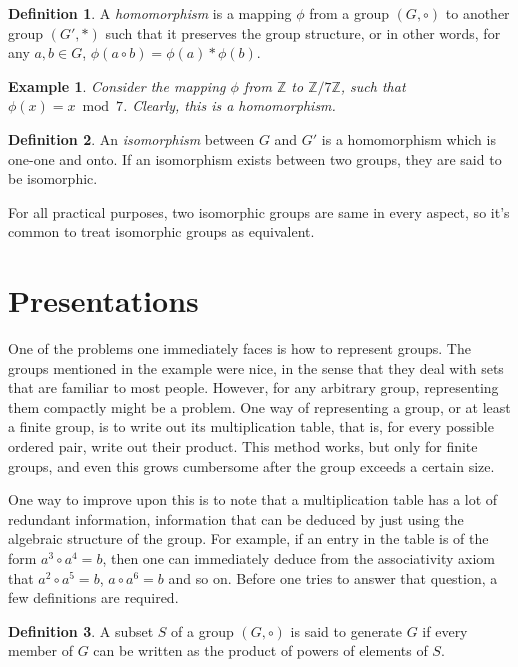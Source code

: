 \documentclass[12pt, titlepage]{article}
\newtheorem{exmp}[thm]{Example}
\theoremstyle{definition}
\newtheorem{defn}{Definition}[section]
\begin{document}
\begin{defn}
A \emph{homomorphism} is a mapping $\phi$ from a group $(G, \circ)$ to another group $(G', *)$ such that it preserves the group structure, or in other words, for any $a,b \in G$, $\phi(a \circ b) = \phi(a) * \phi(b)$.
\end{defn}

\begin{exmp}
Consider the mapping $\phi$ from $\mathbb{Z}$ to $\mathbb{Z}/7\mathbb{Z}$, such that $\phi(x) = x \bmod 7$. Clearly, this is a homomorphism.
\end{exmp}

\begin{defn}
An \emph{isomorphism} between $G$ and $G'$ is a homomorphism which is one-one and onto. If an isomorphism exists between two groups, they are said to be isomorphic.
\end{defn}

For all practical purposes, two isomorphic groups are same in every aspect, so it's common to treat isomorphic groups as equivalent.

\section{Presentations}

One of the problems one immediately faces is how to represent groups. The groups mentioned in the example were nice, in the sense that they deal with sets that are familiar to most people. However, for any arbitrary group, representing them compactly might be a problem. One way of representing a group, or at least a finite group, is to write out its multiplication table, that is, for every possible ordered pair, write out their product. This method works, but only for finite groups, and even this grows cumbersome after the group exceeds a certain size.

One way to improve upon this is to note that a multiplication table has a lot of redundant information, information that can be deduced by just using the algebraic structure of the group. For example, if an entry in the table is of the form $a^3 \circ a^4 = b$, then one can immediately deduce from the associativity axiom that $a^2 \circ a^5 = b$, $a \circ a^6 = b$ and so on. Before one tries to answer that question, a few definitions are required. \cite{johnson}

\begin{defn}
A subset $S$ of a group $(G, \circ)$ is said to generate $G$ if every member of $G$ can be written as the product of powers of elements of $S$.
\end{defn}
\end{document}
